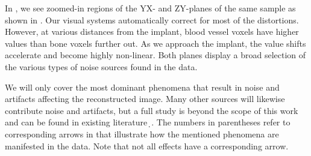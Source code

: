 In , we see zoomed-in regions of the YX- and ZY-planes of the
same sample as shown in .  Our visual systems
automatically correct for most of the distortions. However, at various
distances from the implant, blood vessel voxels have higher values than bone
voxels further out. As we approach the implant, the value shifts accelerate and
become highly non-linear.  Both planes display a broad selection of the various
types of noise sources found in the data.

We will only cover the most dominant phenomena that result in noise and
artifacts affecting the reconstructed image. Many other sources will likewise
contribute noise and artifacts, but a full study is beyond the scope of this
work and can be found in existing
literature~̣\cite{noise_and_artifacts_1,noise_and_artifacts_2}. The numbers in
parentheses refer to corresponding arrows in  that illustrate
how the mentioned phenomena are manifested in the data. Note that not all
effects have a corresponding arrow.

